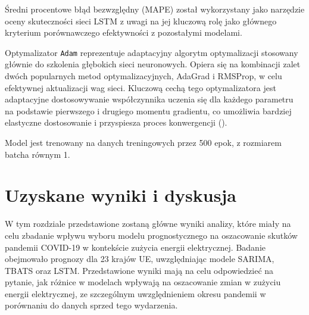 \documentclass[polish, twoside, 12pt, a4paper]{article}
\theoremstyle{definition}
\theoremstyle{plain}
\theoremstyle{remark}
\newcommand{\code}[1]{\lstinline{#1}}
\begin{document}
Średni procentowe błąd bezwzględny (MAPE) został wykorzystany jako narzędzie oceny skuteczności sieci LSTM z uwagi na jej kluczową rolę jako głównego kryterium porównawczego efektywności z pozostałymi modelami.

Optymalizator \code{Adam} reprezentuje adaptacyjny algorytm optymalizacji stosowany głównie do szkolenia głębokich sieci neuronowych. Opiera się na kombinacji zalet dwóch popularnych metod optymalizacyjnych, AdaGrad i RMSProp, w celu efektywnej aktualizacji wag sieci. Kluczową cechą tego optymalizatora jest adaptacyjne dostosowywanie współczynnika uczenia się dla każdego parametru na podstawie pierwszego i drugiego momentu gradientu, co umożliwia bardziej elastyczne dostosowanie i przyspiesza proces konwergencji (\cite{frackiewicz2023}).

Model jest trenowany na danych treningowych przez 500 epok, z rozmiarem batcha równym 1. 

\clearpage
\section{Uzyskane wyniki i dyskusja}\label{sec:wyniki}


W tym rozdziale przedstawione zostaną główne wyniki analizy, które miały na celu zbadanie wpływu wyboru modelu prognostycznego na oszacowanie skutków pandemii COVID-19 w kontekście zużycia energii elektrycznej. Badanie obejmowało prognozy dla 23 krajów UE, uwzględniając modele SARIMA, TBATS oraz LSTM. Przedstawione wyniki mają na celu odpowiedzieć na pytanie, jak różnice w modelach wpływają na oszacowanie zmian w zużyciu energii elektrycznej, ze szczególnym uwzględnieniem okresu pandemii w porównaniu do danych sprzed tego wydarzenia. 
\end{document}
